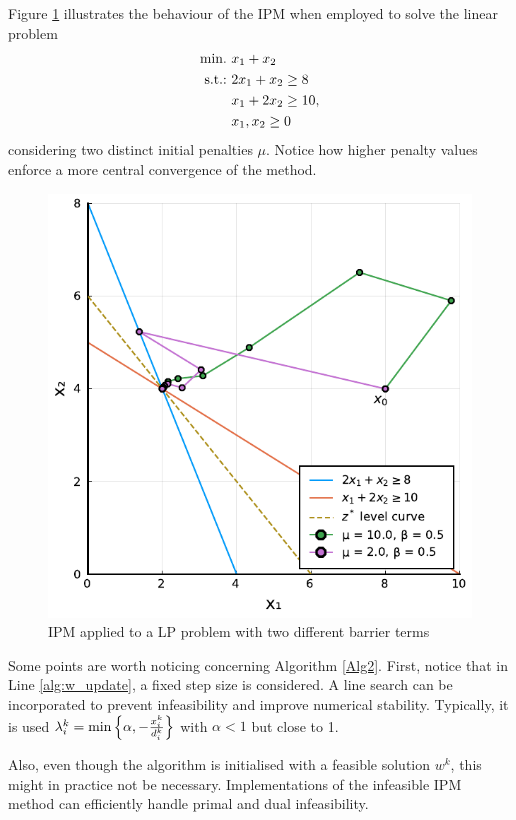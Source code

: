 Figure \ref{fig:lp_example1} illustrates the behaviour of the IPM when employed to solve the linear problem 
%
\begin{align*}
 \mathop{\text{min.~}} 	 & x_1 + x_2 \\
 \mathop{\text{s.t.:~}} 	 & 2x_1 + x_2 \geq 8 \\
 	 	 & x_1 + 2x_2 \geq 10, \\
 	 	 & x_1, x_2 \geq 0	
\end{align*}
%
considering two distinct initial penalties $\mu$. Notice how higher penalty values enforce a more central convergence of the method.
%
\begin{figure}[h]
\includegraphics{part_2/chapter_10/figures/lp_example1-2.pdf}
\caption{IPM applied to a LP problem with two different barrier terms} \label{fig:lp_example1} 	
\end{figure}
%
Some points are worth noticing concerning Algorithm \ref{Alg2}. First, notice that in Line \ref{alg:w_update}, a fixed step size is considered. A line search can be incorporated to prevent infeasibility and improve numerical stability. Typically, it is used $\lambda^k_i = \min\left\{ \alpha, - \frac{x_i^k}{d_i^k} \right \}$ with $\alpha < 1$ but close to 1.

Also, even though the algorithm is initialised with a feasible solution $w^k$, this might in practice not be necessary. Implementations of the infeasible IPM method can efficiently handle primal and dual infeasibility.  

